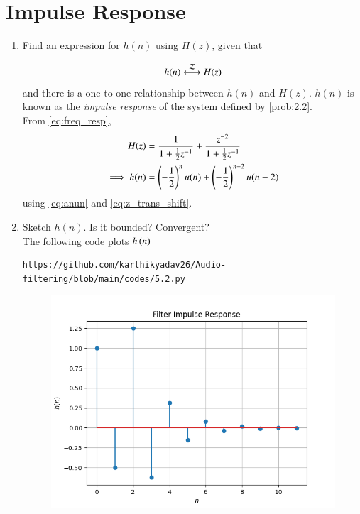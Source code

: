 \documentclass[journal,12pt,twocolumn]{IEEEtran}
\theoremstyle{remark}
\renewcommand\thesection{\arabic{section}}
\begin{document}
\section{Impulse Response}
\begin{enumerate}[label=\thesection.\arabic*]
\item \label{prob:impulse_resp}
Find an expression for $h(n)$ using $H(z)$, given that 

\begin{equation}
\label{eq:impulse_resp}
h(n) \system{Z} H(z)
\end{equation}
and there is a one to one relationship between $h(n)$ and $H(z)$. $h(n)$ is known as the {\em impulse response} of the
system defined by \eqref{prob:2.2}.
\\
\solution From \eqref{eq:freq_resp},
\begin{align}
H(z) &= \frac{1}{1 + \frac{1}{2}z^{-1}} + \frac{ z^{-2}}{1 + \frac{1}{2}z^{-1}}
\\
\implies h(n) &= \left(-\frac{1}{2}\right)^{n}u(n) + \left(-\frac{1}{2}\right)^{n-2}u(n-2)
\end{align}
using \eqref{eq:anun} and \eqref{eq:z_trans_shift}.
\item Sketch $h(n)$. Is it bounded? Convergent? 
\\
\solution The following code plots $h\left(n\right)$ 
\begin{lstlisting}
https://github.com/karthikyadav26/Audio-filtering/blob/main/codes/5.2.py
\end{lstlisting}
\begin{figure}[htbp]
\centering
\includegraphics[width=\columnwidth]{figs/hn}

\end{figure}
\end{enumerate}
\end{document}
